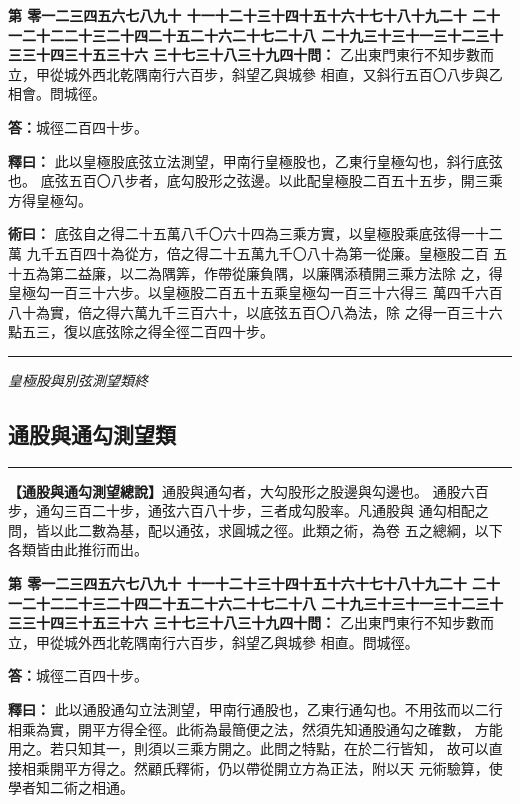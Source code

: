 \documentclass[11pt,a4paper]{article}
\newcommand{\longline}{\noindent\rule{\textwidth}{0.4pt}}
\newcounter{probnum}
\newcommand{\chnum}[1]{%
  \ifcase#1 零\or 一\or 二\or 三\or 四\or 五\or 六\or 七\or 八\or 九\or 十\or
    十一\or 十二\or 十三\or 十四\or 十五\or 十六\or 十七\or 十八\or 十九\or 二十\or
    二十一\or 二十二\or 二十三\or 二十四\or 二十五\or 二十六\or 二十七\or 二十八\or
    二十九\or 三十\or 三十一\or 三十二\or 三十三\or 三十四\or 三十五\or 三十六\or
    三十七\or 三十八\or 三十九\or 四十\fi}
\newcommand{\problem}[1]{\stepcounter{probnum}\par\noindent\textbf{第\chnum{\value{probnum}}問：}#1\par}
\newcommand{\answer}[1]{\par\noindent\textbf{答：}#1\par}
\newcommand{\shiyi}[1]{\par\noindent\textbf{釋曰：}#1\par}
\newcommand{\shuyue}[1]{\par\noindent\textbf{術曰：}#1\par}
\begin{document}
\vspace{0.3cm}
\problem{
乙出東門東行不知步數而立，甲從城外西北乾隅南行六百步，斜望乙與城參
相直，又斜行五百〇八步與乙相會。問城徑。
}

\answer{城徑二百四十步。}

\shiyi{
此以皇極股底弦立法測望，甲南行皇極股也，乙東行皇極勾也，斜行底弦也。
底弦五百〇八步者，底勾股形之弦邊。以此配皇極股二百五十五步，開三乘
方得皇極勾。
}

\shuyue{
底弦自之得二十五萬八千〇六十四為三乘方實，以皇極股乘底弦得一十二萬
九千五百四十為從方，倍之得二十五萬九千〇八十為第一從廉。皇極股二百
五十五為第二益廉，以二為隅筭，作帶從廉負隅，以廉隅添積開三乘方法除
之，得皇極勾一百三十六步。以皇極股二百五十五乘皇極勾一百三十六得三
萬四千六百八十為實，倍之得六萬九千三百六十，以底弦五百〇八為法，除
之得一百三十六點五三，復以底弦除之得全徑二百四十步。
}

\vspace{0.5cm}
\longline
\begin{center}
\textit{皇極股與別弦測望類終}
\end{center}

\newpage
\setcounter{probnum}{0}

\subsection*{通股與通勾測望類}
\vspace{0.3cm}
\longline
\vspace{0.3cm}

\noindent
\textbf{【通股與通勾測望總說】}通股與通勾者，大勾股形之股邊與勾邊也。
通股六百步，通勾三百二十步，通弦六百八十步，三者成勾股率。凡通股與
通勾相配之問，皆以此二數為基，配以通弦，求圓城之徑。此類之術，為卷
五之總綱，以下各類皆由此推衍而出。

\problem{
乙出東門東行不知步數而立，甲從城外西北乾隅南行六百步，斜望乙與城參
相直。問城徑。
}

\answer{城徑二百四十步。}

\shiyi{
此以通股通勾立法測望，甲南行通股也，乙東行通勾也。不用弦而以二行
相乘為實，開平方得全徑。此術為最簡便之法，然須先知通股通勾之確數，
方能用之。若只知其一，則須以三乘方開之。此問之特點，在於二行皆知，
故可以直接相乘開平方得之。然顧氏釋術，仍以帶從開立方為正法，附以天
元術驗算，使學者知二術之相通。
}
\end{document}
